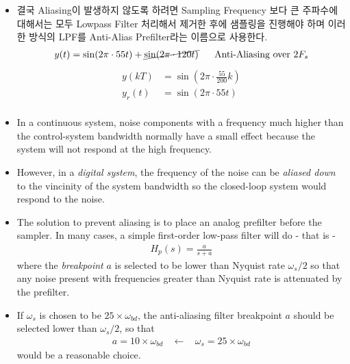 \begin{itemize}
\begin{itemize}
		\item 결국 Aliasing이 발생하지 않도록 하려면 Sampling Frequency 보다 큰 주파수에 대해서는 모두 Lowpass Filter 처리해서 제거한 후에 샘플링을 진행해야 하며 이러한 방식의 LPF를 Anti-Alias Prefilter라는 이름으로 사용한다.
		\begin{align*}
				y(t) = \sin(2 \pi \cdot 55t) +\cancel{\sin(2\pi \cdot 120t)} ~~~~~ \text{Anti-Aliasing over $2 F_s$}
		\end{align*}	
		\begin{align*}
			y(kT) &=   \sin(2 \pi \cdot \frac{55}{200}  k) \\
			y_r(t)&=    \sin(2 \pi \cdot 55t) \\
		\end{align*}

		\item In a continuous system, noise components with a frequency much higher than the control-system bandwidth normally have a small effect because the system will not respond at the high frequency. 
		
		\item However, in a \emph{digital system}, the frequency of the noise can be \emph{aliased down}  to the vincinity of the system bandwidth so the closed-loop system would respond to the noise.
		\item The solution to prevent aliasing is to place an analog prefilter before the sampler. In many cases, a simple first-order low-pass filter will do - that is - 
		\begin{align*}
			H_p(s) = \frac{a}{s+a}
		\end{align*}
		where the \emph{breakpoint} $a$ is selected to be lower than Nyquist rate $\omega_s/2$ so that any noise present with frequencies greater than Nyquist rate is attenuated by the prefilter. 
		\item If $\omega_s$ is chosen to be $25 \times \omega_{bd}$, the anti-aliasing filter breakpoint $a$ should be selected lower than $\omega_s/2$, so that 
		\begin{align*}
			a = 10 \times \omega_{bd} ~~~~\leftarrow~~~~ \omega_s = 25 \times \omega_{bd} 
		\end{align*}
		would be a reasonable choice. 
	\end{itemize}
\end{itemize}
%
%
\newpage
%
